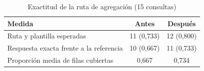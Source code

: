 \begin{table}[htbp!]
    \centering
    \caption{Exactitud de la ruta de agregación (15 consultas)}
    \label{tab:res-agregacion}
    \begin{tabular}{|l|c|c|}
        \hline
        \textbf{Medida} & \textbf{Antes} & \textbf{Después} \\
        \hline
        Ruta y plantilla esperadas & 11 (0{,}733) & 12 (0{,}800) \\
        \hline
        Respuesta exacta frente a la referencia & 10 (0{,}667) & 11 (0{,}733) \\
        \hline
        Proporción media de filas cubiertas & 0{,}667 & 0{,}734 \\
        \hline
    \end{tabular}
\end{table}
